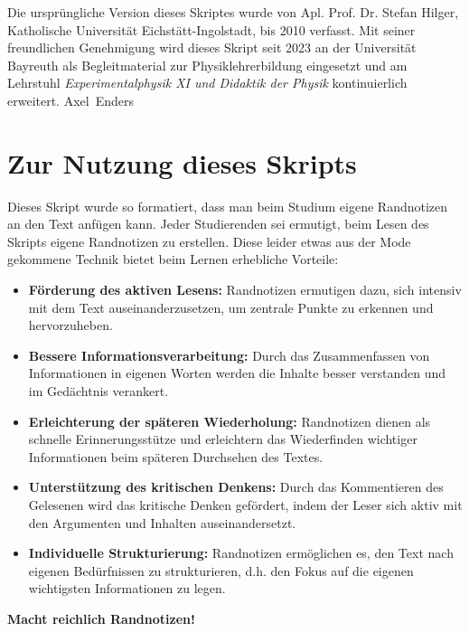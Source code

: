 \documentclass[11pt,a4paper]{book}
\begin{document}
Die urspr\"ungliche Version dieses Skriptes wurde von Apl. Prof. Dr. Stefan Hilger, Katholische Universit\"{a}t Eichst\"{a}tt-Ingolstadt, bis 2010 verfasst. Mit seiner freundlichen Genehmigung wird dieses Skript seit 2023 an der Universit\"{a}t Bayreuth als Begleitmaterial zur Physiklehrerbildung eingesetzt und am Lehrstuhl \emph{Experimentalphysik XI und Didaktik der Physik} kontinuierlich erweitert.   
\bip
\hs{10cm} Axel\ Enders


\newpage
\section*{Zur Nutzung dieses Skripts}

Dieses Skript wurde so formatiert, dass man beim Studium eigene Randnotizen an den Text anf\"{u}gen kann. Jeder Studierenden sei ermutigt, beim Lesen des Skripts eigene Randnotizen zu erstellen. Diese leider etwas aus der Mode gekommene Technik bietet beim Lernen erhebliche Vorteile:

\begin{itemize}
\item \textbf{F\"{o}rderung des aktiven Lesens:} Randnotizen ermutigen dazu, sich intensiv mit dem Text auseinanderzusetzen, um zentrale Punkte zu erkennen und hervorzuheben.

\item \textbf{Bessere Informationsverarbeitung:} Durch das Zusammenfassen von Informationen in eigenen Worten werden die Inhalte besser verstanden und im Ged\"{a}chtnis verankert.

\item \textbf{Erleichterung der sp\"{a}teren Wiederholung:} Randnotizen dienen als schnelle Erinnerungsst\"{u}tze und erleichtern das Wiederfinden wichtiger Informationen beim sp\"{a}teren Durchsehen des Textes.

\item \textbf{Unterst\"{u}tzung des kritischen Denkens:} Durch das Kommentieren des Gelesenen wird das kritische Denken gef\"{o}rdert, indem der Leser sich aktiv mit den Argumenten und Inhalten auseinandersetzt.

\item \textbf{Individuelle Strukturierung:} Randnotizen erm\"{o}glichen es, den Text nach eigenen Bed\"{u}rfnissen zu strukturieren, d.h. den Fokus auf die eigenen wichtigsten Informationen zu legen.
\end{itemize}
\bip
\begin{center} \Large{\textbf{Macht reichlich Randnotizen!}} \end{center}
\end{document}
